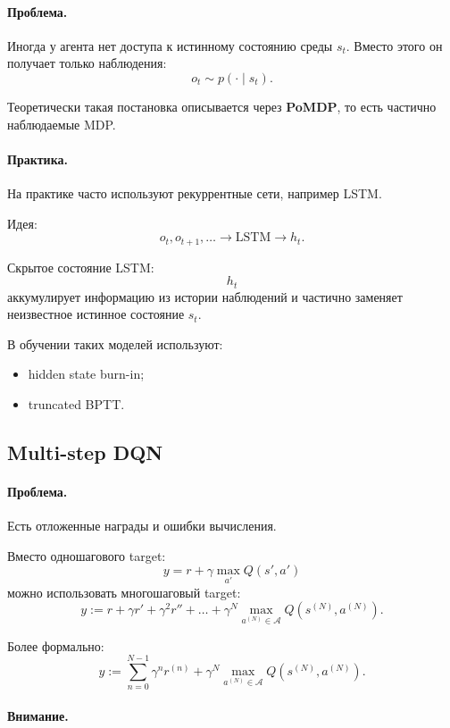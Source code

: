 \documentclass[12pt,a4paper]{article}
\begin{document}
\paragraph{Проблема.}

Иногда у агента нет доступа к истинному состоянию среды $s_t$. Вместо этого он получает только наблюдения:
\[
o_t
\sim
p(\cdot \mid s_t).
\]

Теоретически такая постановка описывается через \textbf{PoMDP}, то есть частично наблюдаемые MDP.

\paragraph{Практика.}

На практике часто используют рекуррентные сети, например LSTM.

Идея:
\[
o_t,o_{t+1},\ldots
\longrightarrow
\text{LSTM}
\longrightarrow
h_t.
\]

Скрытое состояние LSTM:
\[
h_t
\]
аккумулирует информацию из истории наблюдений и частично заменяет неизвестное истинное состояние $s_t$.

В обучении таких моделей используют:
\begin{itemize}
    \item hidden state burn-in;
    \item truncated BPTT.
\end{itemize}

\subsection{Multi-step DQN}

\paragraph{Проблема.}

Есть отложенные награды и ошибки вычисления.

Вместо одношагового target:
\[
y
=
r
+
\gamma
\max_{a'} Q(s',a')
\]
можно использовать многошаговый target:
\[
y
:=
r
+
\gamma r'
+
\gamma^2 r''
+
\ldots
+
\gamma^N
\max_{a^{(N)} \in \mathcal A}
Q(s^{(N)},a^{(N)}).
\]

Более формально:
\[
y
:=
\sum_{n=0}^{N-1}
\gamma^n r^{(n)}
+
\gamma^N
\max_{a^{(N)} \in \mathcal A}
Q(s^{(N)},a^{(N)}).
\]

\paragraph{Внимание.}
\end{document}
